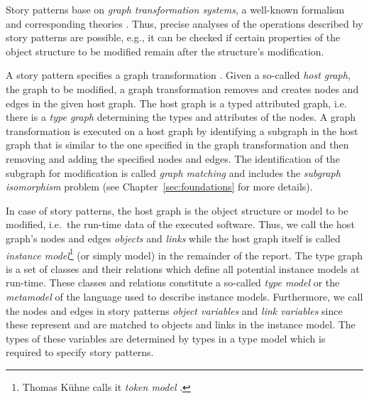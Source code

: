 Story patterns base on \emph{graph transformation systems}, a well-known formalism and corresponding theories \cite{Roz97}.
Thus, precise analyses of the operations described by story patterns are possible,
e.g., it can be checked if certain properties of the object structure to be modified remain after the structure's modification.


A story pattern specifies a graph transformation \cite{Roz97}.
Given a so-called \emph{host graph}, the graph to be modified, a graph transformation removes and creates nodes and edges in the given host graph.
The host graph is a typed attributed graph, i.e. there is a \emph{type graph} determining the types and attributes of the nodes.
A graph transformation is executed on a host graph by identifying a subgraph in the host graph that is similar to the one specified in the graph transformation
and then removing and adding the specified nodes and edges.
The identification of the subgraph for modification is called \emph{graph matching} and includes the \emph{subgraph isomorphism} problem
(see Chapter~\ref{sec:foundations} for more details).

In case of story patterns, the host graph is the object structure or model to be modified, i.e.\ the run-time data of the executed software.
Thus, we call the host graph's nodes and edges \emph{objects} and \emph{links}
while the host graph itself is called \emph{instance model}\footnote{Thomas K\"{u}hne calls it \emph{token model} \cite{Kue06}.} (or simply model) in the remainder of the report.
The type graph is a set of classes and their relations which define all potential instance models at run-time.
These classes and relations constitute a so-called \emph{type model} or the \emph{metamodel} \cite{Kue06} of the language used to describe instance models.
Furthermore, we call the nodes and edges in story patterns \emph{object variables} and \emph{link variables}
since these represent and are matched to objects and links in the instance model.
The types of these variables are determined by types in a type model which is required to specify story patterns.


